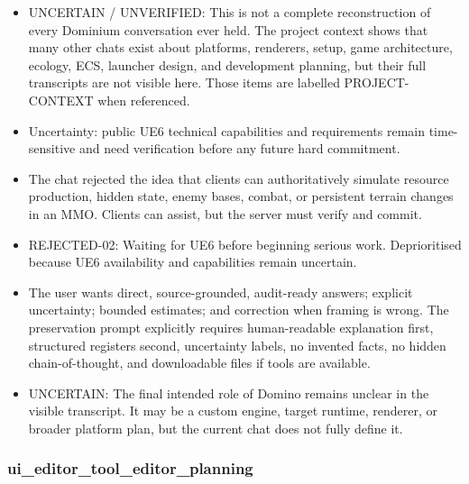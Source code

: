 \documentclass[11pt,a4paper]{report}
\begin{document}
\begin{itemize}
\item UNCERTAIN / UNVERIFIED: This is not a complete reconstruction of every Dominium conversation ever held. The project context shows that many other chats exist about platforms, renderers, setup, game architecture, ecology, ECS, launcher design, and development planning, but their full transcripts are not visible here. Those items are labelled PROJECT-CONTEXT when referenced.
\item Uncertainty: public UE6 technical capabilities and requirements remain time-sensitive and need verification before any future hard commitment.
\item The chat rejected the idea that clients can authoritatively simulate resource production, hidden state, enemy bases, combat, or persistent terrain changes in an MMO. Clients can assist, but the server must verify and commit.
\item REJECTED-02: Waiting for UE6 before beginning serious work. Deprioritised because UE6 availability and capabilities remain uncertain.
\item The user wants direct, source-grounded, audit-ready answers; explicit uncertainty; bounded estimates; and correction when framing is wrong. The preservation prompt explicitly requires human-readable explanation first, structured registers second, uncertainty labels, no invented facts, no hidden chain-of-thought, and downloadable files if tools are available.
\item UNCERTAIN: The final intended role of Domino remains unclear in the visible transcript. It may be a custom engine, target runtime, renderer, or broader platform plan, but the current chat does not fully define it.
\end{itemize}

\subsubsection{ui\_editor\_tool\_editor\_planning}
\end{document}

